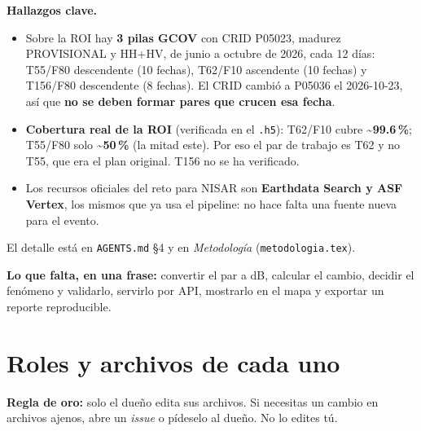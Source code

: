 \documentclass[11pt,a4paper]{article}
\begin{document}
\textbf{Hallazgos clave.}

\begin{itemize}
  \item Sobre la ROI hay \textbf{3 pilas GCOV} con CRID P05023, madurez PROVISIONAL y HH+HV, de junio a octubre de 2026, cada 12 días:
        T55/F80 descendente (10 fechas), T62/F10 ascendente (10 fechas) y T156/F80 descendente (8 fechas). El CRID cambió a P05036
        el 2026-10-23, así que \textbf{no se deben formar pares que crucen esa fecha}.
  \item \textbf{Cobertura real de la ROI} (verificada en el \texttt{.h5}): T62/F10 cubre \textbf{\textasciitilde 99.6\,\%}; T55/F80
        solo \textbf{\textasciitilde 50\,\%} (la mitad este). Por eso el par de trabajo es T62 y no T55, que era el plan original.
        T156 no se ha verificado.
  \item Los recursos oficiales del reto para NISAR son \textbf{Earthdata Search y ASF Vertex}, los mismos que ya usa el pipeline: no
        hace falta una fuente nueva para el evento.
\end{itemize}

El detalle está en \texttt{AGENTS.md} §4 y en \emph{Metodología} (\texttt{metodologia.tex}).

\textbf{Lo que falta, en una frase:} convertir el par a dB, calcular el cambio, decidir el fenómeno y validarlo, servirlo por API,
mostrarlo en el mapa y exportar un reporte reproducible.

\section{Roles y archivos de cada uno}

\begin{nota}
\textbf{Regla de oro:} solo el dueño edita sus archivos. Si necesitas un cambio en archivos ajenos, abre un \emph{issue} o pídeselo
al dueño. No lo edites tú.
\end{nota}
\end{document}
